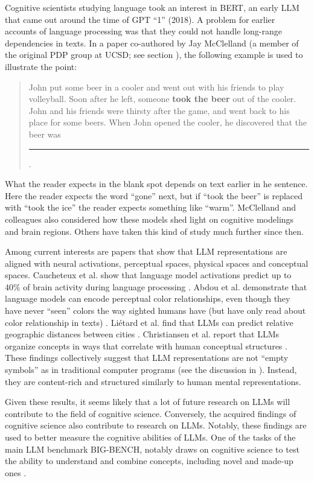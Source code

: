 Cognitive scientists studying language took an interest in BERT, an early LLM that came out around the time of GPT ``1'' (2018).  A problem for earlier accounts of language processing was that they could not handle long-range dependencies in texts. In a paper co-authored by Jay McClelland  \cite{mcclelland2020placing} (a member of the original PDP group at UCSD; see section ), the following example is used to illustrate the point:
\begin{quote}
John put some beer in a cooler and went out with his friends to play volleyball. Soon after he left, someone \textbf{took the beer} out of the cooler. John and his friends were thirsty after the game, and went back to his place for some beers. When John opened the cooler, he discovered that the beer was \rule{1cm}{0.15mm}.
\end{quote}
What the reader expects in the blank spot  depends on text earlier in he sentence.  Here the reader expects the word ``gone'' next, but if ``took the beer'' is replaced with ``took the ice'' the reader expects something like ``warm''.  McClelland and colleagues also considered how these models shed light on cognitive modelings and brain regions. Others have taken this kind of study much further since then.

Among current interests are papers that show that LLM representations are aligned with neural activations,  perceptual spaces,  physical spaces and conceptual spaces. Caucheteux et al. show that language model activations predict up to 40\% of brain activity during language processing \cite{caucheteux2022brains}. Abdou et al. demonstrate that language models can encode perceptual color relationships, even though they have never ``seen'' colors the way sighted humans have (but have only read about color relationship in texts) \cite{abdou2021can}.  Liétard et al. find that LLMs can predict relative geographic distances between cities \cite{lietard2021do}.  Christiansen et al. report that LLMs organize concepts in ways that correlate with human conceptual structures \cite{christiansen2023large}. These findings collectively suggest that LLM representations are not ``empty symbols'' as in traditional computer programs (see the discussion in ). Instead, they are content-rich and structured similarly to human mental representations.

Given these results, it seems likely that a lot of future research on LLMs will contribute to the field of cognitive science. Conversely, the acquired findings of cognitive science also contribute to research on LLMs. Notably, these findings are used to better measure the cognitive abilities of LLMs. One of the tasks of the main LLM benchmark BIG-BENCH, notably draws on cognitive science to test the ability to understand and combine concepts, including novel and made-up ones \cite{srivastava2022beyond}.

